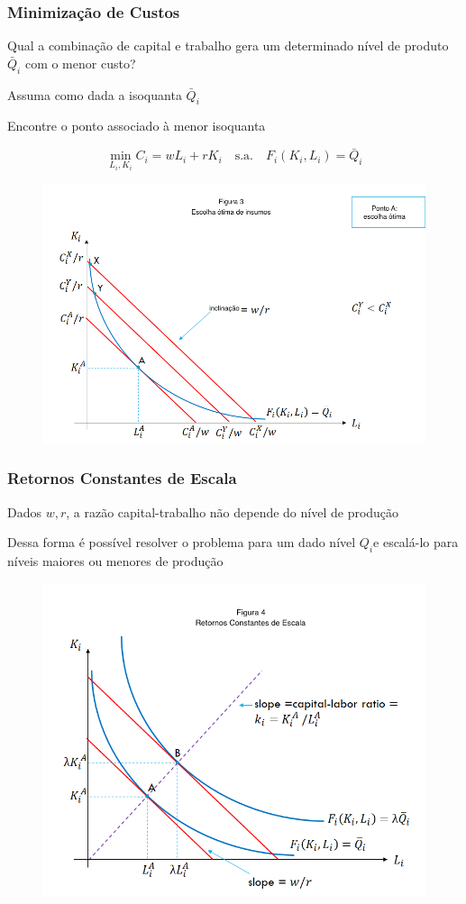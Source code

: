 \documentclass[a4paper,12pt]{article}[abntex2]
\begin{document}
\subsubsection{\textbf{Minimização de Custos}}

Qual a combinação de capital e trabalho gera um determinado nível de produto \(\bar{Q}_i\) com o menor custo?

Assuma como dada a isoquanta \(\bar{Q}_i\)

Encontre o ponto associado à menor isoquanta

\[
\min_{L_i,K_i} C_i = wL_i + rK_i \quad \text{s.a.} \quad F_i(K_i, L_i) = \bar{Q}_i
\]


\begin{figure}[H]
    \centering
    \includegraphics[width=0.5\linewidth]{Imagens/a10i3.png}
\end{figure}

\subsubsection{\textbf{Retornos Constantes de Escala}}

Dados \(w , r\), a razão capital-trabalho não depende do nível de produção

Dessa forma é possível resolver o problema para um dado nível \(Q_i\)e escalá-lo para níveis maiores ou menores de produção

\begin{figure}[H]
    \centering
    \includegraphics[width=0.7\linewidth]{Imagens/a10i4.png}
\end{figure}
\end{document}
